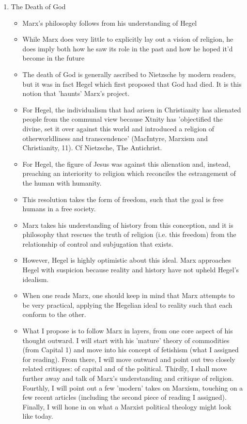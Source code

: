 
\begin{enumerate}
 	\item The Death of God
	\begin{itemize}
		\item Marx's philosophy follows from his understanding of Hegel
		\item While Marx does very little to explicitly lay out a vision of religion, he does imply both how he saw its role in the past and how he hoped it'd become in the future
		\item The death of God is generally ascribed to Nietzsche by modern readers, but it was in fact Hegel which first proposed that God had died. It is this notion that 'haunts' Marx's project.
		\item For Hegel, the individualism that had arisen in Christianity has alienated people from the communal view because Xtnity has 'objectified the divine, set it over against this world and introduced a religion of otherworldliness and transcendence' (MacIntyre, Marxism and Christianity, 11). Cf Nietzsche, The Antichrist.
		\item For Hegel, the figure of Jesus was against this alienation and, instead, preaching an interiority to religion which reconciles the estrangement of the human with humanity.
		\item This resolution takes the form of freedom, such that the goal is free humans in a free society.
		\item Marx takes his understanding of history from this conception, and it is philosophy that rescues the truth of religion (i.e. this freedom) from the relationship of control and subjugation that exists.
		\item However, Hegel is highly optimistic about this ideal. Marx approaches Hegel with suspicion because reality and history have not upheld Hegel's idealism.
		\item When one reads Marx, one should keep in mind that Marx attempts to be very practical, applying the Hegelian ideal to reality such that each conform to the other.
		\item What I propose is to follow Marx in layers, from one core aspect of his thought outward. I will start with his 'mature' theory of commodities (from Capital 1) and move into his concept of fetishism (what I assigned for reading). From there, I will move outward and point out two closely related critiques: of capital and of the political. Thirdly, I shall move further away and talk of Marx's understanding and critique of religion. Fourthly, I will point out a few 'modern' takes on Marxism, touching on a few recent articles (including the second piece of reading I assigned). Finally, I will hone in on what a Marxist political theology might look like today.

\end{itemize}
\end{enumerate}
